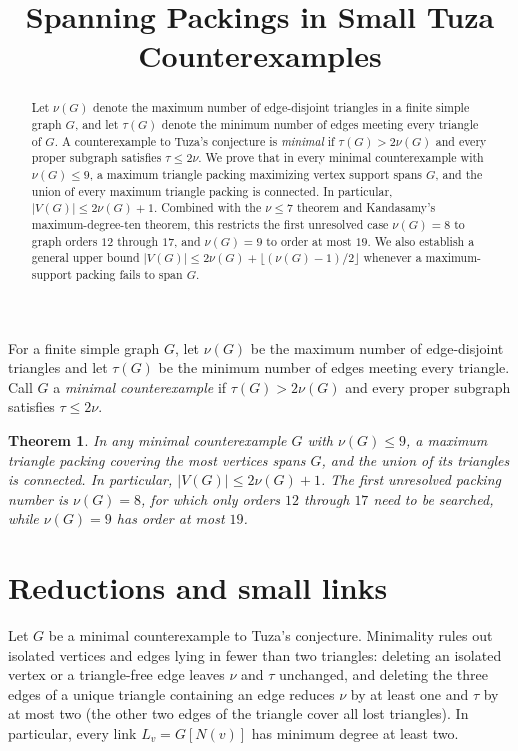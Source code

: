 \documentclass[11pt]{article}
\title{Spanning Packings in Small Tuza Counterexamples}
\author{}
\date{}
\newtheorem{theorem}{Theorem}
\begin{document}
\maketitle

\begin{abstract}
Let $\nu(G)$ denote the maximum number of edge-disjoint triangles in a finite simple graph $G$, and let $\tau(G)$ denote the minimum number of edges meeting every triangle of $G$. A counterexample to Tuza's conjecture is \emph{minimal} if $\tau(G)>2\nu(G)$ and every proper subgraph satisfies $\tau\leq 2\nu$. We prove that in every minimal counterexample with $\nu(G)\leq 9$, a maximum triangle packing maximizing vertex support spans $G$, and the union of every maximum triangle packing is connected. In particular, $|V(G)|\leq 2\nu(G)+1$. Combined with the $\nu\leq 7$ theorem and Kandasamy's maximum-degree-ten theorem, this restricts the first unresolved case $\nu(G)=8$ to graph orders $12$ through $17$, and $\nu(G)=9$ to order at most $19$. We also establish a general upper bound $|V(G)|\leq 2\nu(G)+\lfloor(\nu(G)-1)/2\rfloor$ whenever a maximum-support packing fails to span $G$.
\end{abstract}

For a finite simple graph $G$, let $\nu(G)$ be the maximum number of edge-disjoint triangles and let $\tau(G)$ be the minimum number of edges meeting every triangle. Call $G$ a \emph{minimal counterexample} if $\tau(G)>2\nu(G)$ and every proper subgraph satisfies $\tau\leq 2\nu$.

\begin{theorem}\label{thm:main}
In any minimal counterexample $G$ with $\nu(G)\leq 9$, a maximum triangle packing covering the most vertices spans $G$, and the union of its triangles is connected. In particular, $|V(G)|\leq 2\nu(G)+1$. The first unresolved packing number is $\nu(G)=8$, for which only orders $12$ through $17$ need to be searched, while $\nu(G)=9$ has order at most $19$.
\end{theorem}

\section{Reductions and small links}

Let $G$ be a minimal counterexample to Tuza's conjecture. Minimality rules out isolated vertices and edges lying in fewer than two triangles: deleting an isolated vertex or a triangle-free edge leaves $\nu$ and $\tau$ unchanged, and deleting the three edges of a unique triangle containing an edge reduces $\nu$ by at least one and $\tau$ by at most two (the other two edges of the triangle cover all lost triangles). In particular, every link $L_v=G[N(v)]$ has minimum degree at least two.
\end{document}
